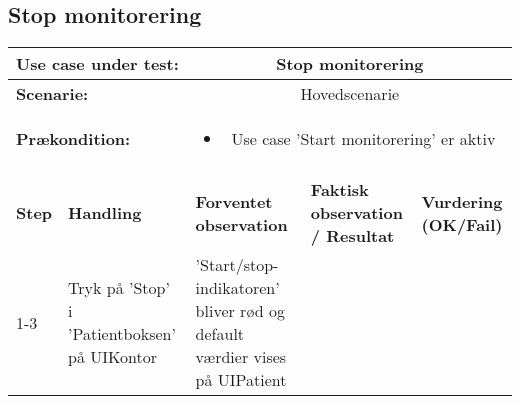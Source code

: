 \subsection{Stop monitorering}
\begin{tabular}{|p{1cm}|p{3cm}|p{4cm}|p{4cm}|p{2cm}|}
\hline
\multicolumn{2}{|p{4cm}|}{\textbf{Use case under test:}} & \multicolumn{3}{c|}{Stop monitorering} \\\hline

\multicolumn{2}{|p{3cm}|}{\textbf{Scenarie:}} & \multicolumn{3}{c|}{Hovedscenarie} \\\hline

\multicolumn{2}{|p{3cm}|}{\textbf{Prækondition:}}  & \multicolumn{3}{c|}{\parbox{0.8\textwidth}{
\begin{itemize}[label=$\circ$]
\item Use case 'Start monitorering' er aktiv
\end{itemize} }}\\\hline

\multicolumn{5}{|c|}{} \\\hline

\textbf{Step} & \textbf{Handling} & \textbf{Forventet observation} & \textbf{Faktisk observation / Resultat} & \textbf{Vurdering (OK/Fail)}\\\hline

1-3 & Tryk på 'Stop' i 'Patientboksen' på UIKontor & 'Start/stop-indikatoren' bliver rød og default værdier vises på UIPatient & & \\\hline

\end{tabular}
\\

